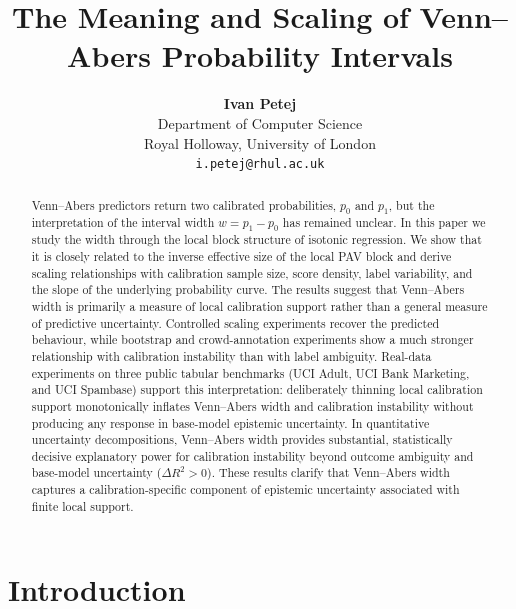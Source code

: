 \documentclass[11pt]{article}
\title{\textbf{The Meaning and Scaling of Venn--Abers Probability Intervals}}
\author{\textbf{Ivan Petej} \\
	\small Department of Computer Science \\
	\small Royal Holloway, University of London \\
	\small \texttt{i.petej@rhul.ac.uk}
}
\date{}
\begin{document}
	\maketitle
	
	\begin{abstract}
		Venn--Abers predictors return two calibrated probabilities, $p_0$ and $p_1$, but the interpretation of the interval width $w=p_1-p_0$ has remained unclear. In this paper we study the width through the local block structure of isotonic regression. We show that it is closely related to the inverse effective size of the local PAV block and derive scaling relationships with calibration sample size, score density, label variability, and the slope of the underlying probability curve. The results suggest that Venn--Abers width is primarily a measure of local calibration support rather than a general measure of predictive uncertainty. Controlled scaling experiments recover the predicted behaviour, while bootstrap and crowd-annotation experiments show a much stronger relationship with calibration instability than with label ambiguity. Real-data experiments on three public tabular benchmarks (UCI Adult, UCI Bank Marketing, and UCI Spambase) support this interpretation: deliberately thinning local calibration support monotonically inflates Venn--Abers width and calibration instability without producing any response in base-model epistemic uncertainty. In quantitative uncertainty decompositions, Venn--Abers width provides substantial, statistically decisive explanatory power for calibration instability beyond outcome ambiguity and base-model uncertainty ($\Delta R^2 > 0$). These results clarify that Venn--Abers width captures a calibration-specific component of epistemic uncertainty associated with finite local support.
	\end{abstract}

\section{Introduction}
	\label{sec:intro}
\end{document}
